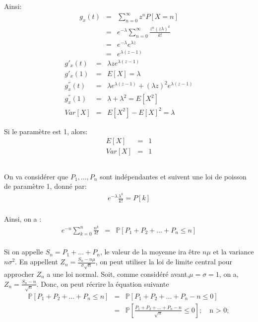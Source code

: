 \documentclass[a4paper]{article}
\begin{document}
Ainsi:
\begin{eqnarray*}
  g_x(t)&=& \sum_{n=0}^{\infty}z^nP[X=n]\\
  &=& e^{-\lambda}\sum_{n=0}^{\infty}\frac{z^n(z\lambda)^k}{k!}\\
  &=& e^{-\lambda}e^{\lambda z}\\
  &=& e^{\lambda(z-1)}
\end{eqnarray*}
\begin{eqnarray*}
  g'_x(t)&=& \lambda ze^{\lambda(z-1)}\\
  g'_x(1)&=&E[X]= \lambda\\
  g^{''}_x(t)&=& \lambda e^{\lambda(z-1)}+(\lambda z)^2e^{\lambda(z-1)}\\
  g^{''}_x(1)&=& \lambda + \lambda^2 = E[X^2]\\
  Var[X] &=& E[X^2]-E[X]^2 = \lambda
\end{eqnarray*}

Si le paramètre est 1, alors:
\begin{eqnarray*}
  E[X]&=& 1\\
  Var[X] &=& 1
\end{eqnarray*}

\subsection{}

On va considérer que $P_1,...,P_n$ sont indépendantes et suivent une loi de poisson de paramètre 1, donné par:
\begin{eqnarray*}
  e^{-\lambda}\frac{\lambda^k}{k!}=P[k]\\
\end{eqnarray*}

Ainsi, on a :
\begin{eqnarray*}
  e^{-n}\sum_{k=0}^n\frac{n^k}{k!}&=&\mathbb{P}[P_1+P_2+...+P_n\leq n]\\
\end{eqnarray*}

Si on appelle $S_n=P_1+\dots+P_n$, le valeur de la moyenne ira être $n\mu$ et la
variance  $n\sigma^2$. En  appellent $Z_n=\frac{S_n-n\mu}{\sigma  \sqrt{n}}$, on
peut  utiliser  la  loi  de  limite  central pour  approcher  $Z_n$  a  une  loi
normal.      Soit,       comme      considéré      avant,$\mu=\sigma=1$,      on
a,$Z_n=\frac{S_n-n}{\sqrt{n}}$. Donc, on peut récrire la équation suivante
\begin{eqnarray*}
 \mathbb{P}[P_1+P_2+...+P_n\leq n]&=& \mathbb{P}[P_1+P_2+...+P_n-n \leq 0] \\
 &=& \mathbb{P}[\frac{P_1+P_2+...+P_n-n}{\sqrt{n}} \leq 0]  ; \quad \text{n > 0};
\end{eqnarray*}
\end{document}
